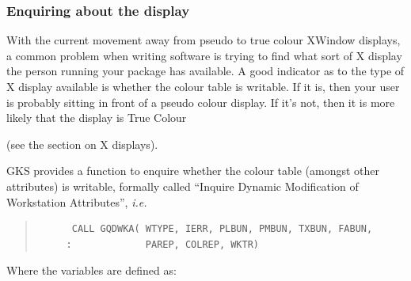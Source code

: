 \documentclass[twoside,11pt]{article}
\newcommand{\htmlref}[2]{#1}
\newcommand{\xref}[3]{#1}
\begin{document}


\subsubsection{Enquiring about the display}

With the current movement away from pseudo to true colour XWindow displays, a common problem when writing software is trying to find what sort of X display
the person running your package has available. A good indicator as to the type of X display available is whether the colour table is writable. If it is, then your user is probably sitting in front of a pseudo colour display. If it's not, then it is more likely that the display is True Colour 
\begin{htmlonly}
(see the section on \htmlref{X displays}{sc15_display}).
\end{htmlonly}

GKS provides a function to enquire whether the colour table (amongst other attributes) is writable, formally called ``Inquire Dynamic Modification of Workstation Attributes'', {\em i.e.\ }

\small
\begin{quote}
\begin{verbatim}
      CALL GQDWKA( WTYPE, IERR, PLBUN, PMBUN, TXBUN, FABUN,
     :             PAREP, COLREP, WKTR)
\end{verbatim}
\end{quote}
\normalsize

Where the variables are defined as:
\end{document}
